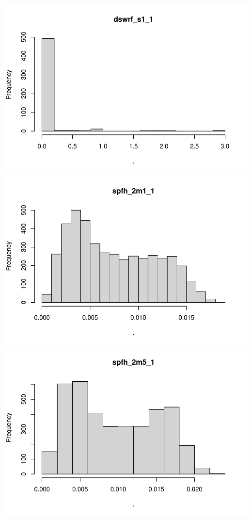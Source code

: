 \documentclass[
  11pt,
  a4paper,
]{article}
\begin{document}
\includegraphics{memoria_practica_1_files/figure-latex/unnamed-chunk-6-1.pdf}
\includegraphics{memoria_practica_1_files/figure-latex/unnamed-chunk-6-2.pdf}
\includegraphics{memoria_practica_1_files/figure-latex/unnamed-chunk-6-3.pdf}
\end{document}
